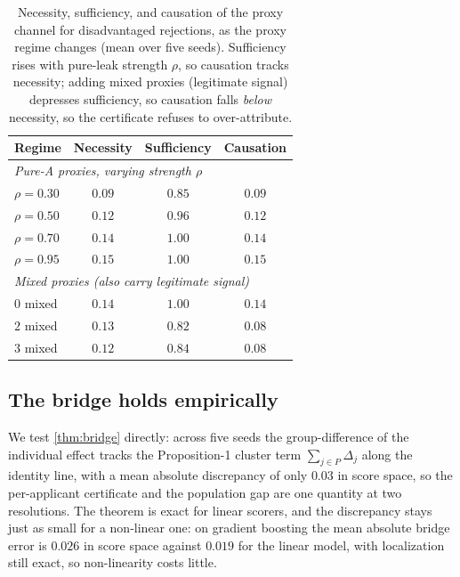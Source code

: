 \documentclass[sn-mathphys-num]{sn-jnl}
\begin{document}
\begin{table}[tbp]
\centering
\caption{Necessity, sufficiency, and causation of the proxy channel for
disadvantaged rejections, as the proxy regime changes (mean over five seeds).
Sufficiency rises with pure-leak strength $\rho$, so causation tracks necessity;
adding mixed proxies (legitimate signal) depresses sufficiency, so causation
falls \emph{below} necessity, so the certificate refuses to over-attribute.}
\label{tab:regime}
\small
\begin{tabular}{lccc}
\toprule
Regime & Necessity & Sufficiency & Causation\\
\midrule
\multicolumn{4}{l}{\textit{Pure-A proxies, varying strength $\rho$}}\\
\quad $\rho=0.30$ & $0.09$ & $0.85$ & $0.09$\\
\quad $\rho=0.50$ & $0.12$ & $0.96$ & $0.12$\\
\quad $\rho=0.70$ & $0.14$ & $1.00$ & $0.14$\\
\quad $\rho=0.95$ & $0.15$ & $1.00$ & $0.15$\\
\midrule
\multicolumn{4}{l}{\textit{Mixed proxies (also carry legitimate signal)}}\\
\quad $0$ mixed & $0.14$ & $1.00$ & $0.14$\\
\quad $2$ mixed & $0.13$ & $0.82$ & $\mathbf{0.08}$\\
\quad $3$ mixed & $0.12$ & $0.84$ & $\mathbf{0.08}$\\
\bottomrule
\end{tabular}
\end{table}

\subsection{The bridge holds empirically}
\label{sec:results-bridge}
We test \cref{thm:bridge} directly: across five seeds the group-difference of the
individual effect tracks the Proposition-1 cluster term $\sum_{j\in P}\Delta_j$
along the identity line, with a mean absolute discrepancy of only $0.03$ in score
space, so the per-applicant certificate and the population gap are one quantity at
two resolutions. The theorem is exact for linear scorers, and the discrepancy
stays just as small for a non-linear one: on gradient boosting the mean absolute
bridge error is $0.026$ in score space against $0.019$ for the linear model, with
localization still exact, so non-linearity costs little.
\end{document}
